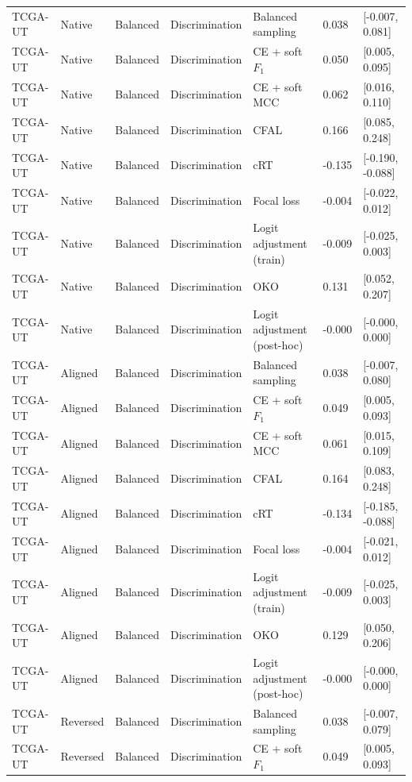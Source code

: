 \begin{longtable}{lllllll}
TCGA-UT & Native & Balanced & Discrimination & Balanced sampling & 0.038 & [-0.007, 0.081] \\
TCGA-UT & Native & Balanced & Discrimination & CE + soft $F_1$ & 0.050 & [0.005, 0.095] \\
TCGA-UT & Native & Balanced & Discrimination & CE + soft MCC & 0.062 & [0.016, 0.110] \\
TCGA-UT & Native & Balanced & Discrimination & CFAL & 0.166 & [0.085, 0.248] \\
TCGA-UT & Native & Balanced & Discrimination & cRT & -0.135 & [-0.190, -0.088] \\
TCGA-UT & Native & Balanced & Discrimination & Focal loss & -0.004 & [-0.022, 0.012] \\
TCGA-UT & Native & Balanced & Discrimination & Logit adjustment (train) & -0.009 & [-0.025, 0.003] \\
TCGA-UT & Native & Balanced & Discrimination & OKO & 0.131 & [0.052, 0.207] \\
TCGA-UT & Native & Balanced & Discrimination & Logit adjustment (post-hoc) & -0.000 & [-0.000, 0.000] \\
TCGA-UT & Aligned & Balanced & Discrimination & Balanced sampling & 0.038 & [-0.007, 0.080] \\
TCGA-UT & Aligned & Balanced & Discrimination & CE + soft $F_1$ & 0.049 & [0.005, 0.093] \\
TCGA-UT & Aligned & Balanced & Discrimination & CE + soft MCC & 0.061 & [0.015, 0.109] \\
TCGA-UT & Aligned & Balanced & Discrimination & CFAL & 0.164 & [0.083, 0.248] \\
TCGA-UT & Aligned & Balanced & Discrimination & cRT & -0.134 & [-0.185, -0.088] \\
TCGA-UT & Aligned & Balanced & Discrimination & Focal loss & -0.004 & [-0.021, 0.012] \\
TCGA-UT & Aligned & Balanced & Discrimination & Logit adjustment (train) & -0.009 & [-0.025, 0.003] \\
TCGA-UT & Aligned & Balanced & Discrimination & OKO & 0.129 & [0.050, 0.206] \\
TCGA-UT & Aligned & Balanced & Discrimination & Logit adjustment (post-hoc) & -0.000 & [-0.000, 0.000] \\
TCGA-UT & Reversed & Balanced & Discrimination & Balanced sampling & 0.038 & [-0.007, 0.079] \\
TCGA-UT & Reversed & Balanced & Discrimination & CE + soft $F_1$ & 0.049 & [0.005, 0.093] \\

\end{longtable}
